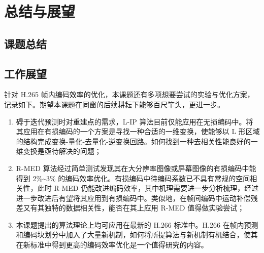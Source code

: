 \chapter{总结与展望}
\label{cha:c5}

\section{课题总结}

\section{工作展望}
针对 H.265 帧内编码效率的优化，本课题还有多项想要尝试的实验与优化方案，记录如下。期望本课题在同窗的后续耕耘下能够百尺竿头，更进一步。
\begin{enumerate}
    \item 碍于迭代预测时对重建点的需求，L-IP 算法目前仅能应用在无损编码中。将其应用在有损编码的一个方案是寻找一种合适的一维变换，使能够以 L 形区域的结构完成变换-量化-去量化-逆变换回路。如何找到一种去相关性能良好的一维变换是亟待解决的问题；
    \item R-MED 算法经过简单测试发现其在大分辨率图像或屏幕图像的有损编码中能得到 2\%\textasciitilde 3\% 的编码效率优化。有损编码中待编码系数已不具有常规的空间相关性，此时 R-MED 仍能改进编码效率，其中机理需要进一步分析梳理，经过进一步改进后有望将其应用到有损编码中。类似地，在帧间编码中运动补偿残差又有其独特的数据相关性，能否在其上应用 R-MED 值得做实验尝试；
    \item 本课题提出的算法理论上均可应用在最新的 H.266 标准中。H.266 在帧内预测和编码块划分中加入了大量新机制，如何将所提算法与新机制有机结合，使其在新标准中得到更高的编码效率优化是一个值得研究的内容。
\end{enumerate}